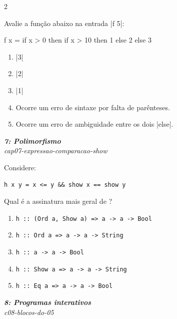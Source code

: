 \documentclass[a4paper,10pt,brazil]{article}
\begin{document}
\begin{multicols}{2}
\begin{flushright}
\end{flushright}
Avalie a função abaixo na entrada \haskellinline|f 5|:
\begin{haskellcode}
f x = if x > 0
      then if x > 10
           then 1
           else 2
      else 3
\end{haskellcode}

\begin{enumerate}
  \item \haskellinline|3|

  \item \haskellinline|2|

  \item \haskellinline|1|

  \item Ocorre um erro de sintaxe por falta de parênteses.

  \item Ocorre um erro de ambiguidade entre os dois \haskellinline|else|.


\end{enumerate}

\begin{flushright}
  \footnotesize
  \textit{\textbf{7: Polimorfismo}}\\
  \textit{cap07-expressao-comparacao-show}\\

\end{flushright}
Considere:

\begin{verbatim}
h x y = x <= y && show x == show y
\end{verbatim}

Qual é a assinatura mais geral de ?

\begin{enumerate}
  \item \texttt{h :: (Ord a, Show a) => a -> a -> Bool}
  \item \texttt{h :: Ord a => a -> a -> String}
  \item \texttt{h :: a -> a -> Bool}
  \item \texttt{h :: Show a => a -> a -> String}
  \item \texttt{h :: Eq a => a -> a -> Bool}

\end{enumerate}

\begin{flushright}
  \footnotesize
  \textit{\textbf{8: Programas interativos}}\\
  \textit{c08-blocos-do-05}\\


\end{flushright}
\end{multicols}
\end{document}
